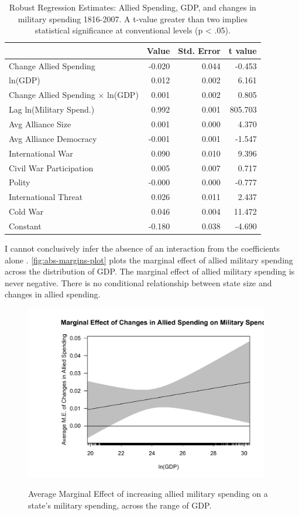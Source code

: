 \documentclass[12pt]{article}
\begin{document}
\begin{table}[ht]
\centering
\begin{tabular}{lrrr}
  \hline
 & Value & Std. Error & t value \\ 
  \hline
	Change Allied Spending & -0.020 & 0.044 & -0.453 \\ 
	ln(GDP) & 0.012 & 0.002 & 6.161 \\ 
	Change Allied Spending $\times$ ln(GDP) & 0.001 & 0.002 & 0.805 \\ 
  Lag ln(Military Spend.) & 0.992 & 0.001 & 805.703 \\ 
  Avg Alliance Size & 0.001 & 0.000 & 4.370 \\ 
  Avg Alliance Democracy & -0.001 & 0.001 & -1.547 \\ 
  International War & 0.090 & 0.010 & 9.396 \\ 
  Civil War Participation & 0.005 & 0.007 & 0.717 \\ 
  Polity & -0.000 & 0.000 & -0.777 \\ 
  International Threat & 0.026 & 0.011 & 2.437 \\ 
  Cold War & 0.046 & 0.004 & 11.472 \\
	Constant & -0.180 & 0.038 & -4.690 \\ 
   \hline
\end{tabular}
\caption{Robust Regression Estimates: Allied Spending, GDP, and changes in military spending 1816-2007. A t-value greater than two implies statistical significance at conventional levels (p < .05).}
\label{tab:rreg-res}
\end{table}


I cannot conclusively infer the absence of an interaction from the coefficients alone \citep{BramborClarkGolder2006}. 
\autoref{fig:abs-margins-plot} plots the marginal effect of allied military spending across the distribution of GDP. 
The marginal effect of allied military spending is never negative. 
There is no conditional relationship between state size and changes in allied spending. 

\begin{figure}
	\centering
		\includegraphics[width=0.95\textwidth]{abs-margins-plot.pdf}
	\label{fig:abs-margins-plot}
	\caption{Average Marginal Effect of increasing allied military spending on a state's military spending, across the range of GDP.}
\end{figure}
\end{document}
